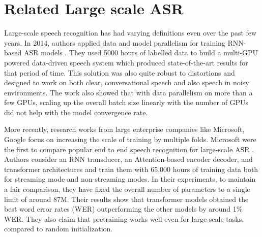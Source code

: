 \section{Related Large scale ASR}
Large-scale speech recognition has had varying definitions even over the past few years. In 2014, authors applied data and model parallelism for training RNN-based ASR models \cite{Hannun2014DeepRecognition}. They used 5000 hours of labelled data to build a multi-GPU powered data-driven speech system which produced state-of-the-art results for that period of time. This solution was also quite robust to distortions and designed to work on both clear, conversational speech and also speech in noisy environments. The work also showed that with data parallelism on more than a few GPUs, scaling up the overall batch size linearly with the number of GPUs did not help with the model convergence rate.

More recently, research works from large enterprise companies like Microsoft, Google focus on increasing the scale of training by multiple folds. Microsoft were the first to compare popular end to end speech recognition for large-scale ASR \cite{Li2020OnRecognition}. Authors consider an RNN transducer, an Attention-based encoder decoder, and transformer architectures and train them with 65,000 hours of training data both for streaming mode and non-streaming modes. In their experiments, to maintain a fair comparison, they have fixed the overall number of parameters to a single limit of around 87M. Their results show that transformer models obtained the best word error rates (WER) outperforming the other models by around 1\% WER. They also claim that pretraining works well even for large-scale tasks, compared to random initialization.

